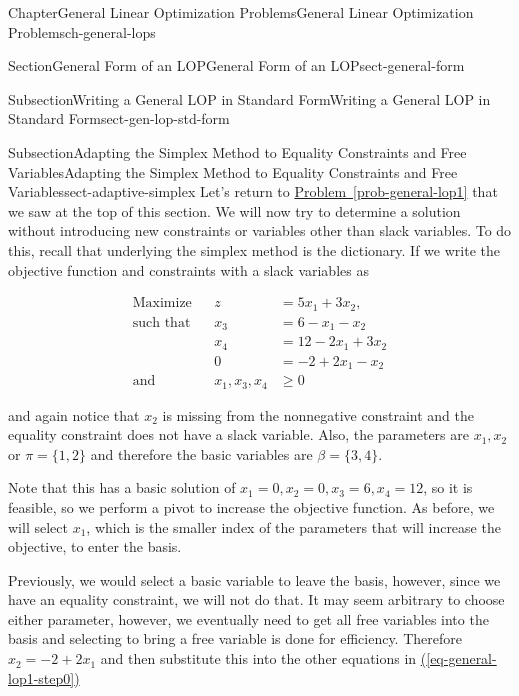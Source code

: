 \documentclass[oneside,10pt,]{book}
\newcommand{\xreffont}{\relax}
\numberwithin{equation}{section}
\newcommand{\amp}{&}
\begin{document}
\begin{chapterptx}{Chapter}{General Linear Optimization Problems}{}{General Linear Optimization Problems}{}{}{ch-general-lops}
\begin{sectionptx}{Section}{General Form of an LOP}{}{General Form of an LOP}{}{}{sect-general-form}
\begin{subsectionptx}{Subsection}{Writing a General LOP in Standard Form}{}{Writing a General LOP in Standard Form}{}{}{sect-gen-lop-std-form}
\end{subsectionptx}
%
%
\typeout{************************************************}
\typeout{************************************************}
%
\begin{subsectionptx}{Subsection}{Adapting the Simplex Method to Equality Constraints and Free Variables}{}{Adapting the Simplex Method to Equality Constraints and Free Variables}{}{}{sect-adaptive-simplex}
Let's return to \hyperref[prob-general-lop1]{Problem~{\xreffont\ref{prob-general-lop1}}}  that we saw at the top of this section. We will now try to determine a solution without introducing new constraints or variables other than slack variables. To do this, recall that underlying the simplex method is the dictionary. If we write the objective function and constraints with a slack variables as%
\par
%
\begin{equation}
\begin{aligned} \text{Maximize} \amp \amp z \amp = 5x_1 + 3x_2, \\ \text{such that} \amp \amp x_3 \amp = 6 - x_1 -x_2 \\ \amp \amp x_4 \amp = 12-2x_1+3x_2 \\ \amp \amp0  \amp = -2 + 2x_1 -x_2   \\ \text{and} \amp \amp x_1, x_3, x_4 \amp \geq 0 \end{aligned}\label{eq-general-lop1-step0}
\end{equation}
%
\par
and again notice that \(x_2\) is missing from the nonnegative constraint and the equality constraint does not have a slack variable. Also, the parameters are \(x_1, x_2\) or \(\pi = \{1,2\}\) and therefore the basic variables are \(\beta=\{3,4\}\).%
\par
Note that this has a basic solution of \(x_1=0, x_2 = 0, x_3 = 6, x_4 = 12\), so it is feasible, so we perform a pivot to increase the objective function. As before, we will select \(x_1\), which is the smaller index of the parameters that will increase the objective, to enter the basis.%
\par
Previously, we would select a basic variable to leave the basis, however, since we have an equality constraint, we will not do that. It may seem arbitrary to choose either parameter, however, we eventually need to get all free variables into the basis and selecting to bring a free variable is done for efficiency. Therefore \(x_2 = -2+2x_1\) and then substitute this into the other equations in \hyperref[eq-general-lop1-step0]{({\xreffont\ref{eq-general-lop1-step0}})}%

\end{subsectionptx}
\end{sectionptx}
\end{chapterptx}
\end{document}
